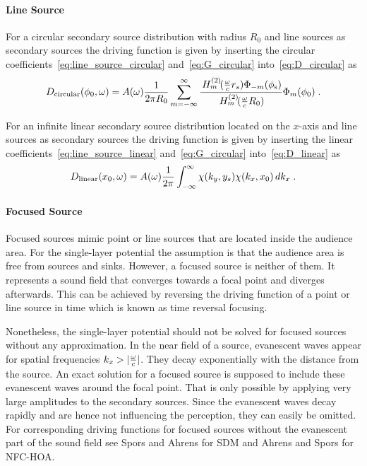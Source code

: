 \paragraph{Line Source}
%
For a circular secondary source distribution with radius $R_0$ and line sources
as secondary sources the driving function is given by inserting the
circular coefficients~\eqref{eq:line_source_circular} and~\eqref{eq:G_circular}
into~\eqref{eq:D_circular} as
%
\begin{equation}
    D_{\text{circular}}(\phi_0,\omega) = A(\omega) \frac{1}{2\pi R_0}
        \sum_{m=-\infty}^{\infty}
        \frac{\H{m}{2}(\omegac r_s) \Phi_{-m}(\phi_\text{s})}
        {\H{m}{2}(\omegac R_0)} \Phi_m(\phi_0) \qp
    \label{eq:D_nfchoa_ls_2D}
\end{equation}
%

For an infinite linear secondary source distribution located on the $x$-axis and
line sources as secondary sources the driving function is given by inserting the
linear coefficients~\eqref{eq:line_source_linear} and~\eqref{eq:G_circular}
into~\eqref{eq:D_linear} as
%
\begin{equation}
    D_\text{linear}(x_0,\omega) = A(\omega) \frac{1}{2\pi}
    \int_{-\infty}^\infty \chi(k_y,y_s) \chi(k_x,x_0) \, dk_x \;.
\end{equation}
%


\paragraph{Focused Source}
%
Focused sources mimic point or line sources that are located inside the audience
area. For the single-layer potential the assumption is that the audience area is
free from sources and sinks. However, a focused source is neither of them. It
represents a sound field that converges towards a focal point and diverges
afterwards. This can be achieved by reversing the driving function of a point or
line source in time which is known as time reversal focusing.\autocite{Yon2003}

Nonetheless, the single-layer potential should not be solved for focused sources
without any approximation. In the near field of a source,
evanescent
waves\autocite[][p.\,24]{Williams1999} appear for spatial frequencies $k_x > |\frac{\omega}{c}|$.
They decay exponentially with the distance from the source. An exact solution for a focused
source is supposed to include these evanescent waves around the focal point.
That is only
possible by applying very large amplitudes to the secondary
sources.
Since the evanescent waves decay rapidly and are hence not
influencing the perception, they can easily be omitted.
For corresponding driving functions for focused sources without the
evanescent part of the sound field see Spors and
Ahrens for
\ac{SDM} and Ahrens and Spors for \ac{NFC-HOA}.


